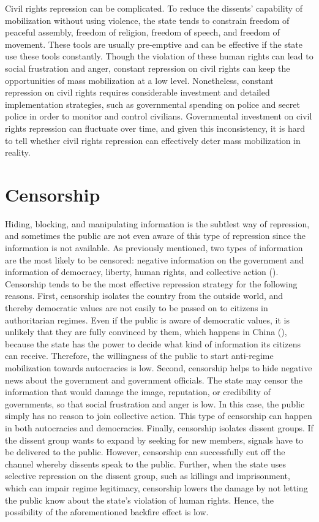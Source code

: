\documentclass[11pt,]{article}
\begin{document}
Civil rights repression can be complicated. To reduce the dissents'
capability of mobilization without using violence, the state tends to
constrain freedom of peaceful assembly, freedom of religion, freedom of
speech, and freedom of movement. These tools are usually pre-emptive and
can be effective if the state use these tools constantly. Though the
violation of these human rights can lead to social frustration and
anger, constant repression on civil rights can keep the opportunities of
mass mobilization at a low level. Nonetheless, constant repression on
civil rights requires considerable investment and detailed
implementation strategies, such as governmental spending on police and
secret police in order to monitor and control civilians. Governmental
investment on civil rights repression can fluctuate over time, and given
this inconsistency, it is hard to tell whether civil rights repression
can effectively deter mass mobilization in reality.

\section{Censorship}

Hiding, blocking, and manipulating information is the subtlest way of
repression, and sometimes the public are not even aware of this type of
repression since the information is not available. As previously
mentioned, two types of information are the most likely to be censored:
negative information on the government and information of democracy,
liberty, human rights, and collective action (\citet{King2013}).
Censorship tends to be the most effective repression strategy for the
following reasons. First, censorship isolates the country from the
outside world, and thereby democratic values are not easily to be passed
on to citizens in authoritarian regimes. Even if the public is aware of
democratic values, it is unlikely that they are fully convinced by them,
which happens in China (\citet{LuandShi2015}), because the state has the
power to decide what kind of information its citizens can receive.
Therefore, the willingness of the public to start anti-regime
mobilization towards autocracies is low. Second, censorship helps to
hide negative news about the government and government officials. The
state may censor the information that would damage the image,
reputation, or credibility of governments, so that social frustration
and anger is low. In this case, the public simply has no reason to join
collective action. This type of censorship can happen in both
autocracies and democracies. Finally, censorship isolates dissent
groups. If the dissent group wants to expand by seeking for new members,
signals have to be delivered to the public. However, censorship can
successfully cut off the channel whereby dissents speak to the public.
Further, when the state uses selective repression on the dissent group,
such as killings and imprisonment, which can impair regime legitimacy,
censorship lowers the damage by not letting the public know about the
state's violation of human rights. Hence, the possibility of the
aforementioned backfire effect is low.
\end{document}
